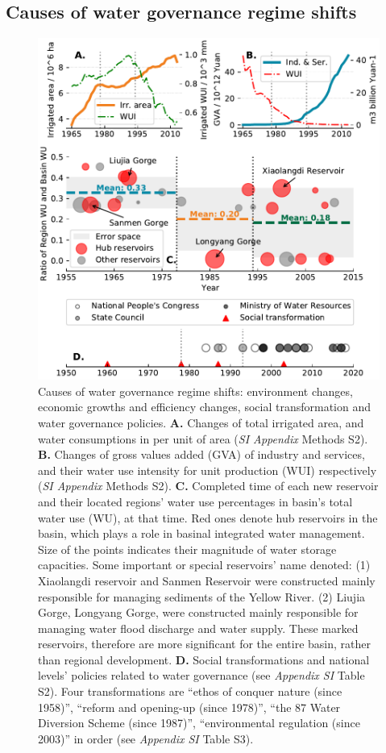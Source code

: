 \documentclass[9pt, twocolumn, twoside, lineno]{pnas-new}
\begin{document}
\subsection*{Causes of water governance regime shifts}
\label{result2}

\begin{figure}[th!]
	\centering
	\includegraphics[width=\linewidth]{../../figures/main/causes.pdf}
	\caption{
		Causes of water governance regime shifts: environment changes, economic growths and efficiency changes, social transformation and water governance policies.
		\textbf{A.} Changes of total irrigated area, and water consumptions in per unit of area (\textit{SI Appendix} Methods S2).
		\textbf{B.} Changes of gross values added (GVA) of industry and services, and their water use intensity for unit production (WUI) respectively (\textit{SI Appendix} Methods S2).
		\textbf{C.} Completed time of each new reservoir and their located regions' water use percentages in basin's total water use (WU), at that time. Red ones denote hub reservoirs in the basin, which plays a role in basinal integrated water management. Size of the points indicates their magnitude of water storage capacities. Some important or special reservoirs' name denoted: (1) Xiaolangdi reservoir and Sanmen Reservoir were constructed mainly responsible for managing sediments of the Yellow River. (2) Liujia Gorge, Longyang Gorge, were constructed mainly responsible for managing water flood discharge and water supply. These marked reservoirs, therefore are more significant for the entire basin, rather than regional development.
		\textbf{D.} Social transformations and national levels' policies related to water governance (see \textit{Appendix SI} Table S2). Four transformations are ``ethos of conquer nature (since 1958)'', ``reform and opening-up (since 1978)'', ``the 87 Water Diversion Scheme (since 1987)'', ``environmental regulation (since 2003)'' in order (see \textit{Appendix SI} Table S3).
	}
	\label{fig:Causes}
\end{figure}
\end{document}
